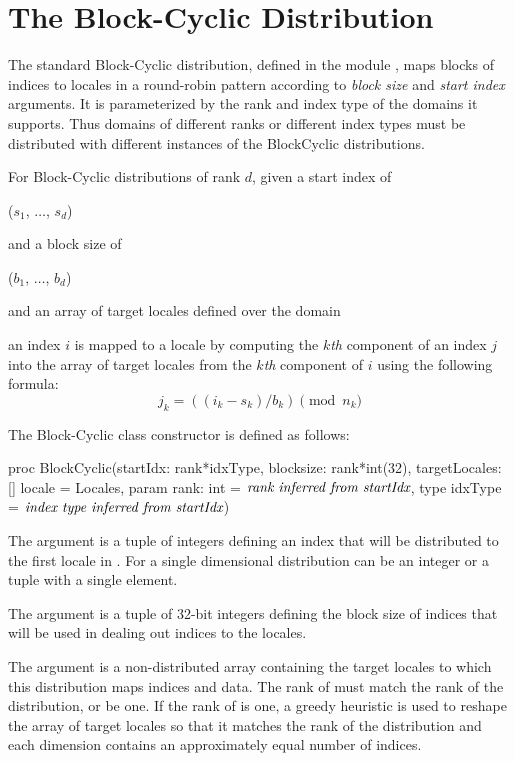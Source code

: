 \section{The Block-Cyclic Distribution}
\label{Block_Cyclic_Dist}
The standard Block-Cyclic distribution, defined in the
module , maps blocks of indices to locales in a
round-robin pattern according to \emph{block size} and \emph{start
index} arguments.  It is parameterized by the rank and index type of
the domains it supports.  Thus domains of different ranks or different
index types must be distributed with different instances of the
BlockCyclic distributions.

For Block-Cyclic distributions of rank $d$, given a start index of
\begin{chapel}
($s_1$, $\ldots$, $s_d$)
\end{chapel}
and a block size of
\begin{chapel}
($b_1$, $\ldots$, $b_d$)
\end{chapel}
and an array of target locales defined over the domain
\begin{chapel}
[$0$..$n_1$-1, $\ldots$, $0$..$n_d$-1]
\end{chapel}
an index $i$ is mapped to a locale by computing
the $k$\emph{th} component of an index $j$ into the array of target
locales from the $k$\emph{th} component of $i$ using the following
formula:
\[j_k = ((i_k - s_k) / b_k) \pmod{n_k}\]

The Block-Cyclic class constructor is defined as follows:
\begin{chapel}
proc BlockCyclic(startIdx: rank*idxType,
                 blocksize: rank*int(32),
                 targetLocales: [] locale = Locales,
                 param rank: int = $\mbox{{\it rank inferred from startIdx}}$,
                 type idxType = $\mbox{{\it index type inferred from startIdx}}$)
\end{chapel}

The argument  is a tuple of integers defining an index that
will be distributed to the first locale in . For a single
dimensional distribution  can be an integer or a tuple with a
single element.

The argument  is a tuple of 32-bit integers defining
the block size of indices that will be used in dealing out indices
to the locales.

The argument  is a non-distributed array
containing the target locales to which this distribution maps indices
and data.  The rank of  must match the rank of the
distribution, or be one.  If the rank of
 is one, a greedy heuristic is used to reshape the
array of target locales so that it matches the rank of the
distribution and each dimension contains an approximately equal number
of indices.

